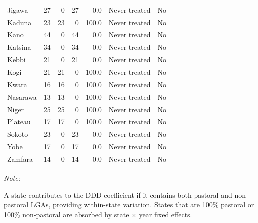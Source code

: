 \begin{table}[!h]
{\begin{threeparttable}
\begin{tabular}[t]{lrrrrll}
Jigawa & 27 & 0 & 27 & 0.0 & Never treated & No\\
\addlinespace
Kaduna & 23 & 23 & 0 & 100.0 & Never treated & No\\
Kano & 44 & 0 & 44 & 0.0 & Never treated & No\\
Katsina & 34 & 0 & 34 & 0.0 & Never treated & No\\
Kebbi & 21 & 0 & 21 & 0.0 & Never treated & No\\
Kogi & 21 & 21 & 0 & 100.0 & Never treated & No\\
\addlinespace
Kwara & 16 & 16 & 0 & 100.0 & Never treated & No\\
Nasarawa & 13 & 13 & 0 & 100.0 & Never treated & No\\
Niger & 25 & 25 & 0 & 100.0 & Never treated & No\\
Plateau & 17 & 17 & 0 & 100.0 & Never treated & No\\
Sokoto & 23 & 0 & 23 & 0.0 & Never treated & No\\
\addlinespace
Yobe & 17 & 0 & 17 & 0.0 & Never treated & No\\
Zamfara & 14 & 0 & 14 & 0.0 & Never treated & No\\
\bottomrule
\end{tabular}
\begin{tablenotes}
\item \textit{Note: } 
\item A state contributes to the DDD coefficient if it contains both pastoral and non-pastoral LGAs, providing within-state variation. States that are 100\% pastoral or 100\% non-pastoral are absorbed by state × year fixed effects.
\end{tablenotes}
\end{threeparttable}}
\end{table}
